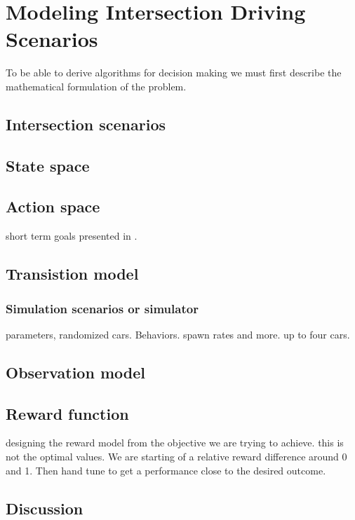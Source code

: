\chapter{Modeling Intersection Driving Scenarios}
To be able to derive algorithms for decision making we must first describe the mathematical formulation of the problem.  

\section{Intersection scenarios}
\section{State space}
\section{Action space}
short term goals presented in \paperLSTM.
\section{Transistion model}
\subsection{Simulation scenarios or simulator}
parameters, randomized cars. Behaviors. spawn rates and more. up to four cars. 
\section{Observation model}
\section{Reward function}
designing the reward model from the objective we are trying to achieve. this is not the optimal values. We are starting of a relative reward difference around 0 and 1. Then hand tune to get a performance close to the desired outcome. 
\section{Discussion}








